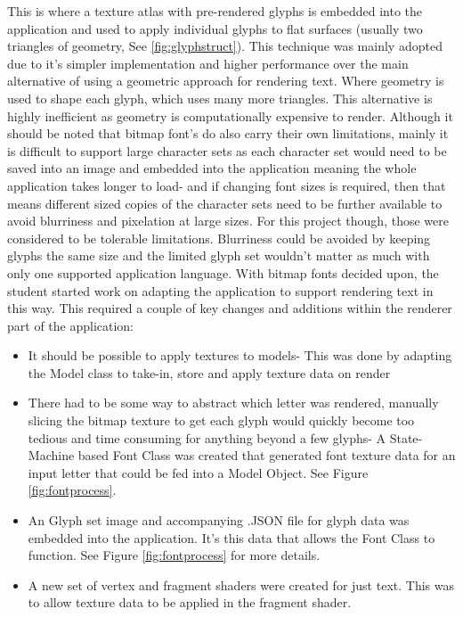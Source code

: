 This is where a texture atlas with pre-rendered glyphs is embedded into the application and used to apply individual glyphs to flat surfaces (usually two triangles of geometry, See \ref{fig:glyphstruct}). This technique was mainly adopted due to it's simpler implementation and higher performance over the main alternative of using a geometric approach for rendering text. Where geometry is used to shape each glyph, which uses many more triangles. This alternative is highly inefficient as geometry is computationally expensive to render. Although it should be noted that bitmap font's do also carry their own limitations, mainly it is difficult to support large character sets as each character set would need to be saved into an image and embedded into the application meaning the whole application takes longer to load- and if changing font sizes is required, then that means different sized copies of the character sets need to be further available to avoid blurriness and pixelation at large sizes.
For this project though, those were considered to be tolerable limitations. Blurriness could be avoided by keeping glyphs the same size and the limited glyph set wouldn't matter as much with only one supported application language.
With bitmap fonts decided upon, the student started work on adapting the application to support rendering text in this way. This required a couple of key changes and additions within the renderer part of the application:
\begin{itemize}
    \item It should be possible to apply textures to models- This was done by adapting the Model class to take-in, store and apply texture data on render
    \item There had to be some way to abstract which letter was rendered, manually slicing the bitmap texture to get each glyph would quickly become too tedious and time consuming for anything beyond a few glyphs- A State-Machine based Font Class was created that generated font texture data for an input letter that could be fed into a Model Object. See Figure \ref{fig:fontprocess}.
    \item An Glyph set image and accompanying .JSON file for glyph data was embedded into the application. It's this data that allows the Font Class to function. See Figure \ref{fig:fontprocess} for more details.
    \item A new set of vertex and fragment shaders were created for just text. This was to allow texture data to be applied in the fragment shader.
\end{itemize}

